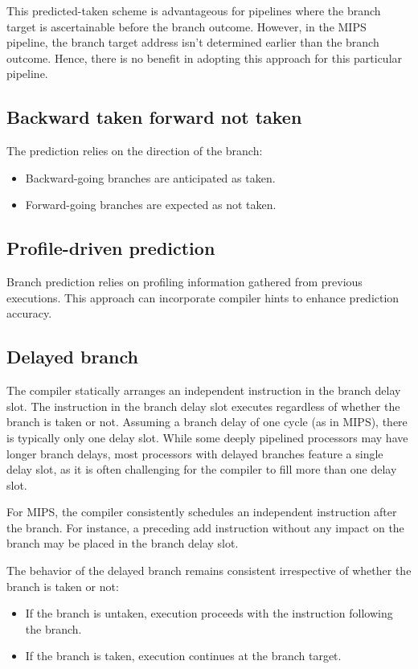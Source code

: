 This predicted-taken scheme is advantageous for pipelines where the branch target is ascertainable before the branch outcome.
However, in the MIPS pipeline, the branch target address isn't determined earlier than the branch outcome. 
Hence, there is no benefit in adopting this approach for this particular pipeline.

\subsection{Backward taken forward not taken }
The prediction relies on the direction of the branch:
\begin{itemize}
    \item Backward-going branches are anticipated as taken.
    \item Forward-going branches are expected as not taken.
\end{itemize}

\subsection{Profile-driven prediction}
Branch prediction relies on profiling information gathered from previous executions.
This approach can incorporate compiler hints to enhance prediction accuracy.

\subsection{Delayed branch}
The compiler statically arranges an independent instruction in the branch delay slot.
The instruction in the branch delay slot executes regardless of whether the branch is taken or not.
Assuming a branch delay of one cycle (as in MIPS), there is typically only one delay slot. 
While some deeply pipelined processors may have longer branch delays, most processors with delayed branches feature a single delay slot, as it is often challenging for the compiler to fill more than one delay slot.

For MIPS, the compiler consistently schedules an independent instruction after the branch. 
For instance, a preceding add instruction without any impact on the branch may be placed in the branch delay slot.

The behavior of the delayed branch remains consistent irrespective of whether the branch is taken or not:
\begin{itemize}
    \item If the branch is untaken, execution proceeds with the instruction following the branch.
    \item If the branch is taken, execution continues at the branch target.
\end{itemize}

